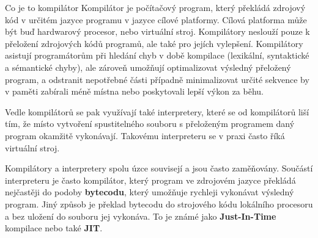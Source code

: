 \sec Co je to kompilátor
Kompilátor je počítačový program, který překládá zdrojový kód v určitém jazyce programu v jazyce cílové platformy. Cílová platforma může být buď hardwarový procesor, nebo virtuální stroj. Kompilátory neslouží pouze k přeložení zdrojových kódů programů, ale také pro jejích vylepšení. Kompilátory asistují programátorům při hledání chyb v době kompilace (lexikální, syntaktické a sémantické chyby), ale zároveň umožňují optimalizovat výsledný přeložený program, a odstranit nepotřebné části případně minimalizovat určité sekvence by v paměti zabírali méně místna nebo poskytovali lepší výkon za běhu.

Vedle kompilátorů se pak využívají také interpretery, které se od kompilátorů liší tím, že místo vytvoření spustitelného souboru s přeloženým programem daný program okamžitě vykonávají. Takovému interpreteru se v praxi často říká virtuální stroj. 

Kompilátory a interpretery spolu úzce souvisejí a jsou často zaměňovány. Součástí interpreteru je často kompilátor, který program ve zdrojovém jazyce překládá nejčastěji do podoby {\bf bytecodu}, který umožňuje rychleji vykonávat výsledný program. Jiný způsob je překlad bytecodu do strojového kódu lokálního procesoru a bez uložení do souboru jej vykonáva. To je známé jako {\bf Just-In-Time} kompilace nebo také {\bf JIT}.
